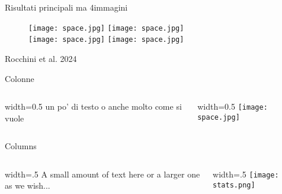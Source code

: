 \documentclass{beamer} %
\begin{document}

\begin{frame}{Risultati principali ma 4immagini} %
    \begin{figure}
        \centering
        \texttt{[image: space.jpg]}
        \texttt{[image: space.jpg]} \\ %
        \texttt{[image: space.jpg]}
        \texttt{[image: space.jpg]} \\ %
\end{figure}
\bigskip %
\centering
\scriptsize{Rocchini et al. 2024} %
\end{frame}


\begin{frame}{Colonne}
    \begin{columns}
    \begin{column}{width=0.5\textwidth}
        un po' di testo o anche molto come si vuole 
    \end{column}
    \begin{column}{width=0.5\textwidth}
          \texttt{[image: space.jpg]}
    \end{column}
    \end{columns}
\end{frame}

\begin{frame}{Columns}
    \begin{columns}
        \begin{column}{width=.5\textwidth}
            A small amount of text  here or a larger one as we wish...
        \end{column}
        \begin{column}{width=.5\textwidth}
            \texttt{[image: stats.png]}
        \end{column}
    \end{columns}
\end{frame}
\end{document}
